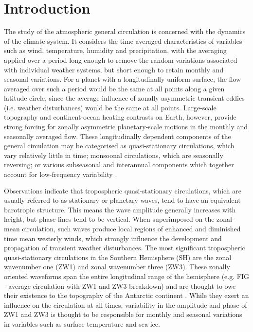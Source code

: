 
\chapter{Introduction}


The study of the atmospheric general circulation is concerned with the dynamics of the climate system. It considers the time averaged characteristics of variables such as wind, temperature, humidity and precipitation, with the averaging applied over a period long enough to remove the random variations associated with individual weather systems, but short enough to retain monthly and seasonal variations. For a planet with a longitudinally uniform surface, the flow averaged over such a period would be the same at all points along a given latitude circle, since the average influence of zonally asymmetric transient eddies (i.e. weather disturbances) would be the same at all points. Large-scale topography and continent-ocean heating contrasts on Earth, however, provide strong forcing for zonally asymmetric planetary-scale motions in the monthly and seasonally averaged flow. These longitudinally dependent components of the general circulation may be categorised as quasi-stationary circulations, which vary relatively little in time; monsoonal circulations, which are seasonally reversing; or various subseasonal and interannual components which together account for low-frequency variability \citep{Holton2013}.

Observations indicate that tropospheric quasi-stationary circulations, which are usually referred to as stationary or planetary waves, tend to have an equivalent barotropic structure. This means the wave amplitude generally increases with height, but phase lines tend to be vertical. When superimposed on the zonal-mean circulation, such waves produce local regions of enhanced and diminished time mean westerly winds, which strongly influence the development and propagation of transient weather disturbances. The most significant tropospheric quasi-stationary circulations in the Southern Hemisphere (SH) are the zonal wavenumber one (ZW1) and zonal wavenumber three (ZW3). These zonally oriented waveforms span the entire longitudinal range of the hemisphere (e.g. FIG - average circulation with ZW1 and ZW3 breakdown) and are thought to owe their existence to the topography of the Antarctic continent \citep{Baines1989}. While they exert an influence on the circulation at all times, variability in the amplitude and phase of ZW1 and ZW3 is thought to be responsible for monthly and seasonal variations in variables such as surface temperature and sea ice.


